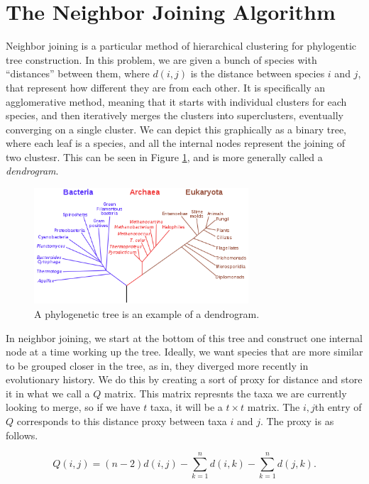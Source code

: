 \section{The Neighbor Joining Algorithm}

Neighbor joining is a particular method of hierarchical clustering for phylogentic tree construction. In this problem, we are given a bunch of species with ``distances'' between them, where $d(i,j)$ is the distance between species $i$ and $j$, that represent how different they are from each other. It is specifically an agglomerative method, meaning that it starts with individual clusters for each species, and then iteratively merges the clusters into superclusters, eventually converging on a single cluster. We can depict this graphically as a binary tree, where each leaf is a species, and all the internal nodes represent the joining of two clustesr. This can be seen in Figure \ref{tree}, and is more generally called a {\em dendrogram}.

\begin{figure}[h!]\label{tree}
  \caption{A phylogenetic tree is an example of a dendrogram.}
  \begin{center}
    \includegraphics[width=8cm]{phylogenetictree.png}
  \end{center}
\end{figure}

In neighbor joining, we start at the bottom of this tree and construct one internal node at a time working up the tree. Ideally, we want species that are more similar to be grouped closer in the tree, as in, they diverged more recently in evolutionary history. We do this by creating a sort of proxy for distance and store it in what we call a $Q$ matrix. This matrix represnts the taxa we are currently looking to merge, so if we have $t$ taxa, it will be a $t\times t$ matrix. The $i,j$th entry of $Q$ corresponds to this distance proxy between taxa $i$ and $j$. The proxy is as follows.

\[Q(i,j) = (n-2)d(i,j) -\sum_{k=1}^n d(i,k) - \sum_{k=1}^n d(j,k).\]


